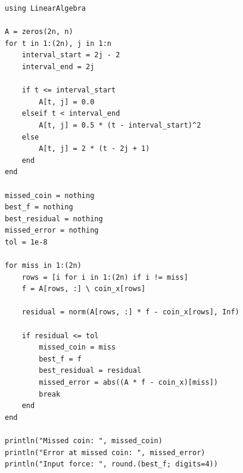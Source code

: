 \begin{lstlisting}
using LinearAlgebra

A = zeros(2n, n)
for t in 1:(2n), j in 1:n
    interval_start = 2j - 2
    interval_end = 2j

    if t <= interval_start
        A[t, j] = 0.0
    elseif t < interval_end
        A[t, j] = 0.5 * (t - interval_start)^2
    else
        A[t, j] = 2 * (t - 2j + 1)
    end
end

missed_coin = nothing
best_f = nothing
best_residual = nothing
missed_error = nothing
tol = 1e-8

for miss in 1:(2n)
    rows = [i for i in 1:(2n) if i != miss]
    f = A[rows, :] \ coin_x[rows]

    residual = norm(A[rows, :] * f - coin_x[rows], Inf)

    if residual <= tol
        missed_coin = miss
        best_f = f
        best_residual = residual
        missed_error = abs((A * f - coin_x)[miss])
        break
    end
end

println("Missed coin: ", missed_coin)
println("Error at missed coin: ", missed_error)
println("Input force: ", round.(best_f; digits=4))
\end{lstlisting}
